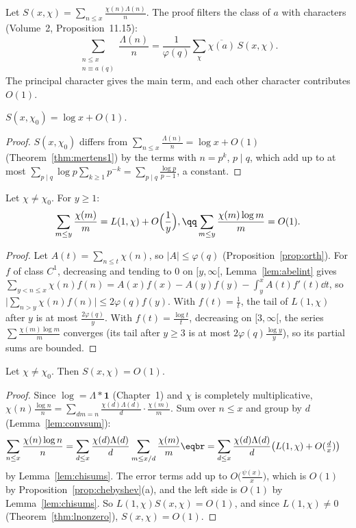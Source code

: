 Let $S(x,\chi)=\sum_{n\le x}\frac{\chi(n)\Lambda(n)}n$. The proof filters the class of $a$ with characters (Volume~2, Proposition~11.15):
\[
\sum_{\substack{n\le x\\n\equiv a\,(q)}}\frac{\Lambda(n)}n=\frac1{\varphi(q)}\sum_\chi\overline{\chi(a)}\,S(x,\chi).
\]
The principal character gives the main term, and each other character contributes $O(1)$.

\begin{lemma}\label{lem:principal}
$S(x,\chi_0)=\log x+O(1)$.
\end{lemma}
\begin{proof}
$S(x,\chi_0)$ differs from $\sum_{n\le x}\frac{\Lambda(n)}n=\log x+O(1)$ (Theorem~\ref{thm:mertens1}) by the terms with $n=p^k$, $p\mid q$, which add up to at most
$\sum_{p\mid q}\log p\sum_{k\ge1}p^{-k}=\sum_{p\mid q}\frac{\log p}{p-1}$, a constant.
\end{proof}

\begin{lemma}\label{lem:chisums}
Let $\chi\ne\chi_0$. For $y\ge1$:
\[
\begin{gathered}\sum_{m\le y}\frac{\chi(m)}m=L(1,\chi)+O\Bigl(\frac1y\Bigr),\qq\sum_{m\le y}\frac{\chi(m)\log m}m=O(1).\end{gathered}
\]
\end{lemma}
\begin{proof}
Let $A(t)=\sum_{n\le t}\chi(n)$, so $|A|\le\varphi(q)$ (Proposition~\ref{prop:orth}). For $f$ of class $C^1$, decreasing and tending to $0$ on $[y,\infty[$, Lemma~\ref{lem:abelint}
gives $\sum_{y<n\le x}\chi(n)f(n)=A(x)f(x)-A(y)f(y)-\int_y^xA(t)f'(t)\dd t$, so $\bigl|\sum_{n>y}\chi(n)f(n)\bigr|\le2\varphi(q)f(y)$. With $f(t)=\frac1t$, the tail of $L(1,\chi)$ after $y$ is
at most $\frac{2\varphi(q)}y$. With $f(t)=\frac{\log t}t$, decreasing on $[3,\infty[$, the series $\sum\frac{\chi(m)\log m}m$ converges (its tail after $y\ge3$ is at most $2\varphi(q)\frac{\log y}y$),
so its partial sums are bounded.
\end{proof}

\begin{proposition}\label{prop:nonprincipal}
Let $\chi\ne\chi_0$. Then $S(x,\chi)=O(1)$.
\end{proposition}
\begin{proof}
Since $\log=\Lambda*\mathbf1$ (Chapter~1) and $\chi$ is completely multiplicative, $\chi(n)\frac{\log n}n=\sum_{dm=n}\frac{\chi(d)\Lambda(d)}d\cdot\frac{\chi(m)}m$. Sum over $n\le x$ and group
by $d$ (Lemma~\ref{lem:convsum}):
\[
\begin{aligned}\sum_{n\le x}\frac{\chi(n)\log n}n&=\sum_{d\le x}\frac{\chi(d)\Lambda(d)}d\sum_{m\le x/d}\frac{\chi(m)}m\eqbr=\sum_{d\le x}\frac{\chi(d)\Lambda(d)}d\bigl(L(1,\chi)+O(\tfrac dx)\bigr)\end{aligned}
\]
by Lemma~\ref{lem:chisums}. The error terms add up to $O\bigl(\frac{\psi(x)}x\bigr)$, which is $O(1)$ by Proposition~\ref{prop:chebyshev}(a), and the left
side is $O(1)$ by Lemma~\ref{lem:chisums}. So $L(1,\chi)S(x,\chi)=O(1)$, and since $L(1,\chi)\ne0$ (Theorem~\ref{thm:lnonzero}), $S(x,\chi)=O(1)$.
\end{proof}

